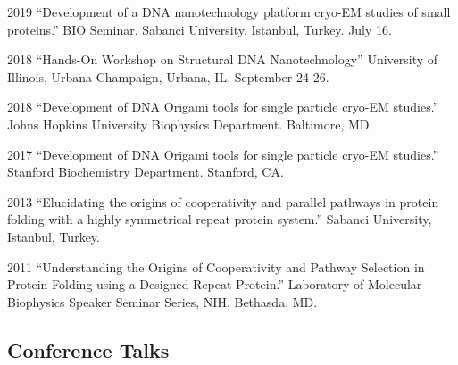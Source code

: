 \documentclass[12pt,letterpaper]{report}
\begin{document}
    \begin{tablist}

        \item[2019] \tab{}\enquote{Development of a DNA nanotechnology platform cryo-EM studies of small proteins.} BIO Seminar. Sabanci University, Istanbul, Turkey. July 16.

        \item[2018] \tab{}\enquote{Hands-On Workshop on Structural DNA Nanotechnology} University of Illinois, Urbana-Champaign, Urbana, IL. September 24-26.

        \item[2018] \tab{}\enquote{Development of DNA Origami tools for single particle cryo-EM studies.} Johns Hopkins University Biophysics Department. Baltimore, MD.

        \item[2017] \tab{}\enquote{Development of DNA Origami tools for single particle cryo-EM studies.} Stanford Biochemistry Department. Stanford, CA.

        \item[2013] \tab{}\enquote{Elucidating the origins of cooperativity and parallel pathways in protein folding with a highly symmetrical repeat protein system.} Sabanci University, Istanbul, Turkey.

        \item[2011] \tab{}\enquote{Understanding the Origins of Cooperativity and Pathway Selection in Protein Folding using a Designed Repeat Protein.} Laboratory of Molecular Biophysics Speaker Seminar Series, NIH, Bethasda, MD.
    
    \end{tablist}

    \subsection*{Conference Talks}
\end{document}
